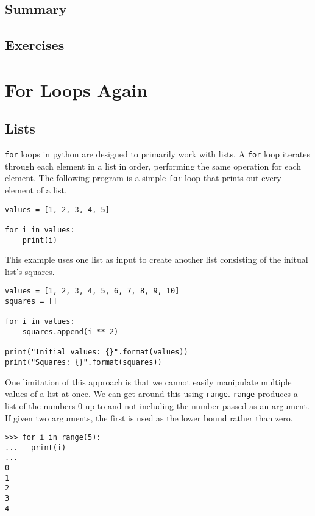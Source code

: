 \documentclass[11pt]{cselabheader}
\begin{document}
\subsection{Summary}

\subsection{Exercises}
\label{subsec:stringsex}

\section{For Loops Again}
\subsection{Lists}
\lstinline{for} loops in python are designed to primarily work with lists. A \lstinline{for} loop iterates through each element in a list in order, performing the same operation for each element. The following program is a simple \lstinline{for} loop that prints out every element of a list.

\begin{lstlisting}[style=python]
values = [1, 2, 3, 4, 5]

for i in values:
    print(i)
\end{lstlisting}

This example uses one list as input to create another list consisting of the initual list's squares.

\begin{lstlisting}[style=python]
values = [1, 2, 3, 4, 5, 6, 7, 8, 9, 10]
squares = []

for i in values:
    squares.append(i ** 2)

print("Initial values: {}".format(values))
print("Squares: {}".format(squares))
\end{lstlisting}

One limitation of this approach is that we cannot easily manipulate multiple values of a list at once. We can get around this using \lstinline{range}. \lstinline{range} produces a list of the numbers 0 up to and not including the number passed as an argument. If given two arguments, the first is used as the lower bound rather than zero.

\begin{lstlisting}[style=ipython]
>>> for i in range(5):
...   print(i)
... 
0
1
2
3
4
\end{lstlisting}
\end{document}
